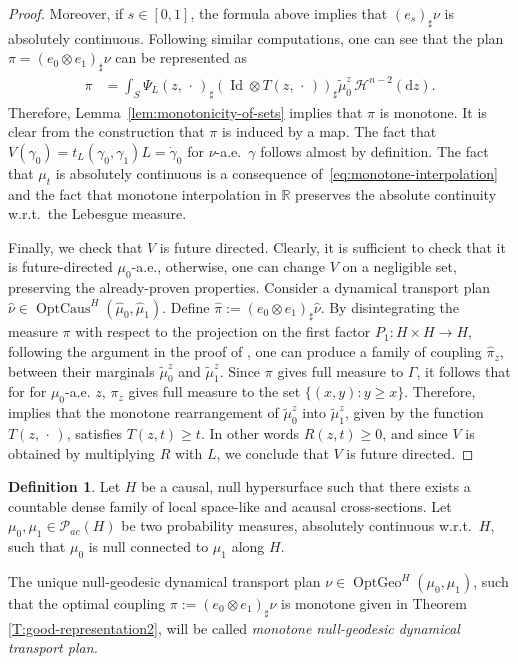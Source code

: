 \documentclass[12pt,a4paper]{amsart}
\theoremstyle{plain}
\theoremstyle{definition}
\newtheorem{definition}[lemma]{Definition}
\numberwithin{equation}{section}
\newcommand{\R}{\mathbb{R}}
\DeclareMathOperator{\OptCaus}{OptCaus}
\DeclareMathOperator{\OptGeo}{OptGeo}
\DeclareMathOperator{\id}{Id}
\newcommand{\de}{{\mathrm{d}}}
\newcommand{\haus}{\mathcal{H}}
\newcommand{\Prob}{\mathcal P}
\newcommand{\dotargument}{\,\cdot\,}
\newcommand{\gflow}{\Psi}
\begin{document}
\begin{proof}
  Moreover, if $s\in[0,1]$, the formula above implies that
  $(e_s)_{\sharp}\nu$ is absolutely continuous.
  Following similar computations, one can see that the plan
  $\pi=(e_0\otimes e_1)_{\sharp}\nu$ can be represented as
  \begin{align*}
    \pi
    &
    =
    \int_S
      \gflow_L(z,\dotargument)_{\sharp} (\id\otimes T(z,\dotargument))_\sharp
      \tilde\mu_0^z
    \,
      \haus^{n-2}(\de z)
      .
  \end{align*}
  Therefore, Lemma~\ref{lem:monotonicity-of-sets} implies that $\pi$
  is monotone. It is clear from the construction that $\pi$ is induced by a map.
  The fact that $V(\gamma_0)=t_L(\gamma_0,\gamma_1)L=\dot\gamma_0$ for
  $\nu$-a.e.\ $\gamma$ follows almost by definition.
  The fact that $\mu_t$ is absolutely continuous is a
  consequence of~\eqref{eq:monotone-interpolation} and the fact that
  monotone interpolation in $\R$ preserves the absolute continuity
  w.r.t.\ the Lebesgue measure.
  
  Finally, we check that $V$ is future directed.
  Clearly, it is sufficient to check that it is future-directed
  $\mu_0$-a.e., otherwise, one can change $V$ on a negligible set, preserving the already-proven properties.
  Consider a dynamical transport plan
  $\widehat\nu\in  \OptCaus^H(\widehat\mu_0,\widehat\mu_1)$.
  Define $\widehat\pi:=(e_0\otimes e_1)_{\sharp}\widehat\nu$.
  By disintegrating the measure $\pi$  with respect to the projection on the first factor $P_1:H\times H\to H$, following the argument in the
  proof of , one can produce a family of coupling $\widehat \pi_z$, between their marginals $\tilde\mu_0^z$ and
  $\tilde\mu_1^z$.
  Since $\pi$ gives full measure to $\Gamma$, it follows that for  for $\mu_0$-a.e. $z$, $\pi_z$ gives full measure to the set $\{(x,y) \colon y\geq
  x\}$.
  Therefore,  implies that the monotone
  rearrangement of $\tilde\mu_0^z$ into $\tilde\mu_1^z$, given by the
  function $T(z,\dotargument)$, satisfies $T(z,t)\geq t$.
  In other words $R(z,t)\geq 0$, and since $V$ is obtained by
  multiplying $R$ with $L$, we conclude that $V$ is future directed.
\end{proof}

\begin{definition}
 Let $H$ be a causal, null hypersurface such that there exists a countable
  dense family of local space-like and acausal cross-sections. 
  Let $\mu_0,\mu_1\in \Prob_{ac}(H)$ be two probability measures,
  absolutely continuous w.r.t.\ $H$, such that
  $\mu_0$ is null connected to $\mu_1$ along $H$.  
  
  The unique null-geodesic dynamical transport plan
  $\nu\in\OptGeo^H(\mu_0,\mu_1)$, such that the optimal coupling $\pi:=(e_0\otimes e_1)_{\sharp}\nu$ is monotone given in Theorem \ref{T:good-representation2}, will be called \emph{monotone null-geodesic dynamical transport plan.}
\end{definition}
\end{document}
